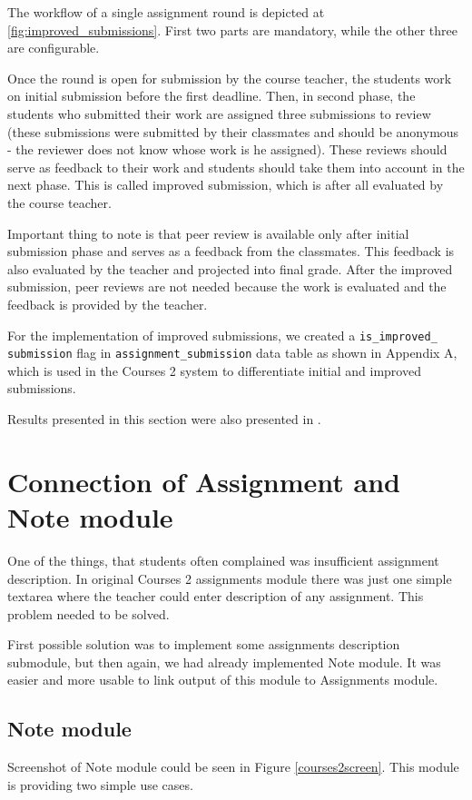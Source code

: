 The workflow of a single assignment round is depicted at \ref{fig:improved_submissions}. First two parts are mandatory, while the other three are configurable.


Once the round is open for submission by the course teacher, the students work on initial submission before the first deadline. Then, in second phase, the students who submitted their work are assigned three submissions to review (these submissions were submitted by their classmates and should be anonymous - the reviewer does not know whose work is he assigned). These reviews should serve as feedback to their work and students should take them into account in the next phase. This is called improved submission, which is after all evaluated by the course teacher.

Important thing to note is that peer review is available only after initial submission phase and serves as a feedback from the classmates. This feedback is also evaluated by the teacher and projected into final grade. After the improved submission, peer reviews are not needed because the work is evaluated and the feedback is provided by the teacher.

For the implementation of improved submissions, we created a \texttt{is\_improved\_ submission} flag in 
\texttt{assignment\_submission} data table as shown in Appendix A, which is used in the Courses 2 system to differentiate initial and improved submissions.

Results presented in this section were also presented in \cite{peerreview}.

\section{Connection of Assignment and Note module}

One of the things, that students often complained was insufficient assignment description. In original Courses 2 assignments module there was just one simple textarea where the teacher could enter description of any assignment. This problem needed to be solved.

First possible solution was to implement some assignments description submodule, but then again, we had already implemented Note module. It was easier and more usable to link output of this module to Assignments module.

\subsection{Note module}
Screenshot of Note module could be seen in Figure \ref{courses2screen}. This module is providing two simple use cases.


